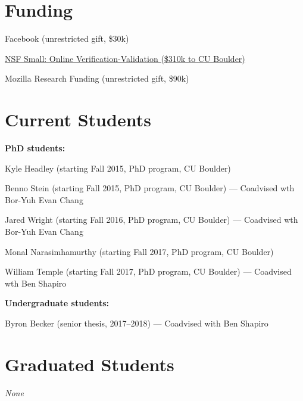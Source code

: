 \documentclass[10pt,letterpaper]{article}
\newcommand{\ReviewItem}[1]{\item #1}
\newcommand{\ReviewItemsBegin}{\begin{itemize}}
\newcommand{\ReviewItemsEnd}{\end{itemize}}
\renewenvironment{itemize}{
  \begin{list}{}{
    \setlength{\leftmargin}{1.5em}
    \setlength{\itemsep}{0.25em}
    \setlength{\parskip}{0pt}
    \setlength{\parsep}{0.25em}
  }
}{
  \end{list}
}
\begin{document}
\section*{Funding}
\begin{itemize}
\item Facebook (unrestricted gift, \$30k)

\item \href{https://www.nsf.gov/awardsearch/showAward?AWD_ID=1619282}
  {NSF Small: Online Verification-Validation (\$310k to CU Boulder)}

\item Mozilla Research Funding (unrestricted gift, \$90k)
\end{itemize}

\section*{Current Students}

\noindent
\textbf{PhD students:}
\begin{itemize}
\item Kyle Headley (starting Fall 2015, PhD program, CU Boulder)
\item Benno Stein (starting Fall 2015, PhD program, CU Boulder) --- Coadvised wth Bor-Yuh Evan Chang
\item Jared Wright (starting Fall 2016, PhD program, CU Boulder) --- Coadvised wth Bor-Yuh Evan Chang
\item Monal Narasimhamurthy (starting Fall 2017, PhD program, CU Boulder)
\item William Temple (starting Fall 2017, PhD program, CU Boulder) --- Coadvised wth Ben Shapiro
\end{itemize}

\noindent
\textbf{Undergraduate students:}
\begin{itemize}
\item Byron Becker (senior thesis, 2017--2018) --- Coadvised with Ben Shapiro
\end{itemize}

\section*{Graduated Students}

\ReviewItemsBegin
\ReviewItem{ \emph{None} }
\ReviewItemsEnd

\end{document}
